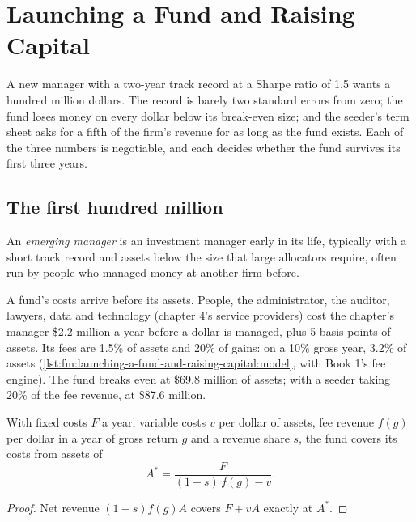 \chapter{Launching a Fund and Raising Capital}\label{ch:fm:launching-a-fund-and-raising-capital}

A new manager with a two-year track record at a Sharpe ratio of 1.5 wants a hundred million dollars. The record is barely two standard errors from
zero; the fund loses money on every dollar below its break-even size; and the seeder's term sheet asks for a fifth of the firm's revenue for as
long as the fund exists. Each of the three numbers is negotiable, and each decides whether the fund survives its first three years.

\section{The first hundred million}

\begin{definition}\label{def:fm:launching-a-fund-and-raising-capital:emerging}
An \emph{emerging manager} is an investment manager early in its life, typically with a short track record and assets below
the size that large allocators require, often run by people who managed money at another firm before.
\end{definition}

A fund's costs arrive before its assets. People, the administrator, the auditor, lawyers, data and technology (chapter 4's service providers) cost
the chapter's manager \$2.2 million a year before a dollar is managed, plus 5 basis points of assets. Its fees are 1.5\% of assets and 20\% of gains:
on a 10\% gross year, 3.2\% of assets (\cref{lst:fm:launching-a-fund-and-raising-capital:model}, with Book 1's fee engine). The fund breaks even at
\$69.8 million of assets; with a seeder taking 20\% of the fee revenue, at \$87.6 million.

\begin{proposition}\label{prop:fm:launching-a-fund-and-raising-capital:be}
With fixed costs $F$ a year, variable costs $v$ per dollar of assets, fee revenue $f(g)$ per dollar in a year of gross return $g$ and a revenue
share $s$, the fund covers its costs from assets of
\[
A^*=\frac{F}{(1-s)\,f(g)-v}.
\]
\end{proposition}

\begin{proof}
Net revenue $(1-s)f(g)A$ covers $F+vA$ exactly at $A^*$.
\end{proof}

